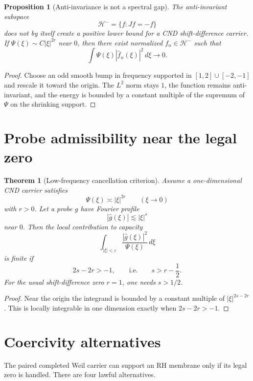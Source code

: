 \documentclass[11pt]{article}
\newtheorem{theorem}{Theorem}
\newtheorem{proposition}{Proposition}
\newcommand{\dd}{\,d}
\begin{document}
\begin{proposition}[Anti-invariance is not a spectral gap]
The anti-invariant subspace
\[
  \mathcal H^- =\{f:Jf=-f\}
\]
does not by itself create a positive lower bound for a CND shift-difference carrier. If $\Psi(\xi)\sim C|\xi|^{2r}$ near $0$, then there exist normalized $f_n\in\mathcal H^-$ such that
\[
  \int \Psi(\xi)|\widehat f_n(\xi)|^2\dd\xi\to0.
\]
\end{proposition}

\begin{proof}
Choose an odd smooth bump in frequency supported in $[1,2]\cup[-2,-1]$ and rescale it toward the origin. The $L^2$ norm stays $1$, the function remains anti-invariant, and the energy is bounded by a constant multiple of the supremum of $\Psi$ on the shrinking support.\end{proof}

\section{Probe admissibility near the legal zero}

\begin{theorem}[Low-frequency cancellation criterion]
Assume a one-dimensional CND carrier satisfies
\[
  \Psi(\xi)\asymp |\xi|^{2r}
  \qquad (\xi\to0)
\]
with $r>0$. Let a probe $g$ have Fourier profile
\[
  |\widehat g(\xi)|\lesssim |\xi|^s
\]
near $0$. Then the local contribution to capacity
\[
  \int_{|\xi|<\varepsilon}\frac{|\widehat g(\xi)|^2}{\Psi(\xi)}\dd\xi
\]
is finite if
\[
  2s-2r>-1,
  \qquad\text{i.e.}\qquad
  s>r-\frac12.
\]
For the usual shift-difference zero $r=1$, one needs $s>1/2$.
\end{theorem}

\begin{proof}
Near the origin the integrand is bounded by a constant multiple of $|\xi|^{2s-2r}$. This is locally integrable in one dimension exactly when $2s-2r>-1$.\end{proof}

\section{Coercivity alternatives}
The paired completed Weil carrier can support an RH membrane only if its legal zero is handled. There are four lawful alternatives.
\end{document}
